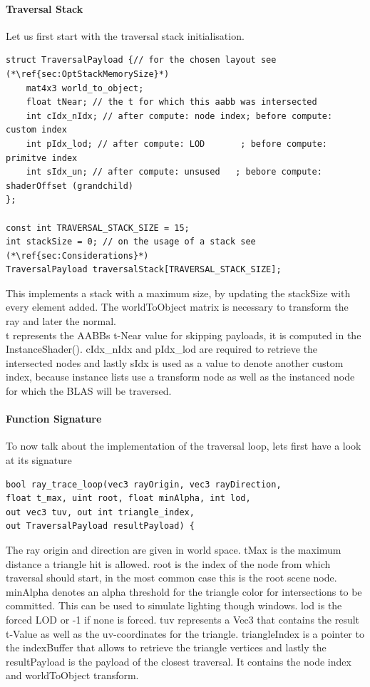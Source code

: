 \paragraph{Traversal Stack}
Let us first start with the traversal stack initialisation.
\begin{lstlisting}
struct TraversalPayload {// for the chosen layout see (*\ref{sec:OptStackMemorySize}*)
	mat4x3 world_to_object;
	float tNear; // the t for which this aabb was intersected
	int cIdx_nIdx; // after compute: node index; before compute: custom index
	int pIdx_lod; // after compute: LOD       ; before compute: primitve index
	int sIdx_un; // after compute: unsused   ; bebore compute: shaderOffset (grandchild)
};

const int TRAVERSAL_STACK_SIZE = 15;
int stackSize = 0; // on the usage of a stack see (*\ref{sec:Considerations}*)
TraversalPayload traversalStack[TRAVERSAL_STACK_SIZE];
\end{lstlisting}
This implements a stack with a maximum size, by updating the stackSize with every element added. The worldToObject matrix is necessary to transform the ray and later the normal.\\
t represents the AABBs t-Near value for skipping payloads, it is computed in the InstanceShader().
cIdx\_nIdx and pIdx\_lod are required to retrieve the intersected nodes and lastly sIdx is used as a value to denote another custom index, because instance lists use a transform node as well as the instanced node for which the BLAS will be traversed.
\newpage
\paragraph{Function Signature}
To now talk about the implementation of the traversal loop, lets first have a look at its signature
\begin{lstlisting}
bool ray_trace_loop(vec3 rayOrigin, vec3 rayDirection, 
float t_max, uint root, float minAlpha, int lod,
out vec3 tuv, out int triangle_index, 
out TraversalPayload resultPayload) {
\end{lstlisting}
The ray origin and direction are given in world space. tMax is the maximum distance a triangle hit is allowed. root is the index of the node from which traversal should start, in the most common case this is the root scene node. minAlpha denotes an alpha threshold for the triangle color for intersections to be committed. This can be used to simulate lighting though windows. lod is the forced LOD or -1 if none is forced. tuv represents a Vec3 that contains the result t-Value as well as the uv-coordinates for the triangle. triangleIndex is a pointer to the indexBuffer that allows to retrieve the triangle vertices and lastly the resultPayload is the payload of the closest traversal. It contains the node index and worldToObject transform.\\

